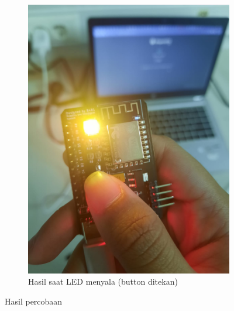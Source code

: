 \begin{figure}[H]
\begin{subfigure}[c]{0.4\linewidth}
    \includegraphics[width=\linewidth]{img/modul_4/hasil_nyala.jpg}
    \caption{Hasil saat LED menyala (button ditekan)\label{fig:inisub2}}
  \end{subfigure}
  \caption*{Hasil percobaan \label{fig:keduagambar}}
\end{figure}